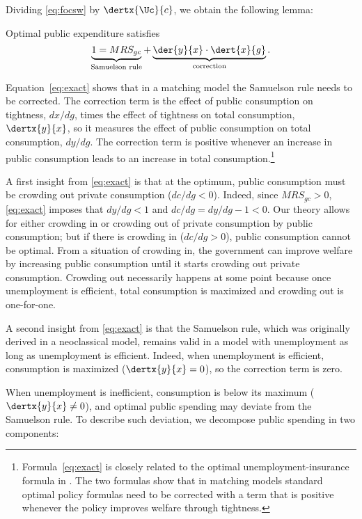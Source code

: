 \documentclass[letterpaper,12pt,leqno]{article}
\begin{document}
\begin{bibunit}
Dividing \eqref{eq:focsw} by $\dertx{\Uc}{c}$, we obtain the following lemma:

\begin{lem} Optimal public expenditure satisfies
\begin{equation}
\underbrace{1=MRS_{gc}}_{\text{Samuelson rule}}+\underbrace{\der{y}{x}\cdot \dert{x}{g}}_{\text{correction}}.
\label{eq:exact}\end{equation}\end{lem}

Equation~\eqref{eq:exact} shows that in a matching model the Samuelson rule needs to be corrected. The correction term is the effect of public consumption on tightness, $dx/dg$, times the effect of tightness on total consumption, $\dertx{y}{x}$, so it measures the effect of public consumption on total consumption, $dy/dg$. The correction term is positive whenever an increase in public consumption leads to an increase in total consumption.\footnote{Formula~\eqref{eq:exact} is closely related to the optimal unemployment-insurance formula in . The two formulas show that in matching models standard optimal policy formulas need to be corrected with a term that is positive whenever the policy improves welfare through tightness.} 

A first insight from \eqref{eq:exact} is that at the optimum, public consumption must be crowding out private consumption ($dc/dg<0$). Indeed, since $MRS_{gc}>0$, \eqref{eq:exact} imposes that $dy/dg<1$ and $dc/dg = dy/dg-1 <0$. Our theory allows for either crowding in or crowding out of private consumption by public consumption; but if there is crowding in ($dc/dg>0$), public consumption cannot be optimal. From a situation of crowding in, the government can improve welfare by increasing public consumption until it starts crowding out private consumption. Crowding out necessarily happens at some point because once unemployment is efficient, total consumption is maximized and crowding out is one-for-one.

A second insight from \eqref{eq:exact} is that the Samuelson rule, which was originally derived in a neoclassical model, remains valid in a model with unemployment as long as unemployment is efficient. Indeed, when unemployment is efficient, consumption is maximized ($\dertx{y}{x}=0$), so the correction term is zero.

When unemployment is inefficient, consumption is below its maximum ($\dertx{y}{x}\neq 0$), and optimal public spending may deviate from the Samuelson rule. To describe such deviation, we decompose public spending in two components:


\end{bibunit}
\end{document}

